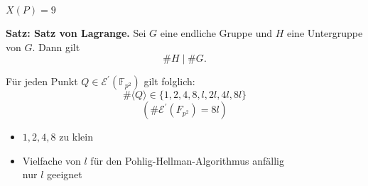 \begin{frame}{$X(P)=9$}
    \begin{algorithmblock}{\textbf{Satz: Satz von Lagrange.}}
        Sei $G$ eine endliche Gruppe und $H$ eine Untergruppe von $G$. Dann gilt
        \[\#H \mid \#G.\]
    \end{algorithmblock}
    \vspace{1em}
    Für jeden Punkt $Q\in \mathcal{E}^\prime(\mathbb{F}_{p^2})$ gilt folglich:
    \[ \#\langle Q\rangle \in \{1,2,4,8,l,2l,4l,8l\}\] 
     \[(\#\mathcal{E}^\prime(F_{p^2})=8l)\]
     \vspace{-1em}
     \begin{itemize}
         \item $1,2,4,8$ zu klein
         \item Vielfache von $l$ für den Pohlig-Hellman-Algorithmus anfällig\\
         \rightarrow nur $l$ geeignet
     \end{itemize}
     
     
     
    
    \begin{center}
    \end{center}


\end{frame}